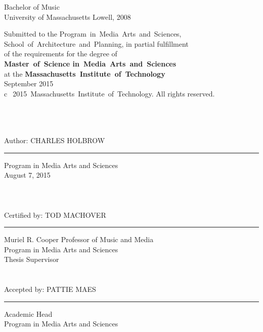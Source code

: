 
\noindent Bachelor of Music\\
\noindent University of Massachusetts Lowell, 2008\\

\vspace{30mm}

\begin{raggedright}
\noindent Submitted to the Program~in~Media~Arts~and~Sciences,\\
School~of~Architecture~and~Planning, in partial fulfillment\\
of the requirements for the degree of\\
\textbf{Master~of~Science in~Media~Arts~and~Sciences}\\
at the \textbf{Massachusetts~Institute~of~Technology} \\
\noindent September 2015\\
\noindent \textcircled{c}~2015~Massachusetts~Institute~of~Technology. All rights reserved.\\
\end{raggedright}

\begin{fullwidth}
\mbox{ }\\
\mbox{ }\\
\mbox{ }\\


\noindent Author: \hfill CHARLES HOLBROW\vspace{3pt}\hrule\vspace{6pt}
\flushright Program in Media Arts and Sciences\\
\flushright August 7, 2015\\
\mbox{ }\\
\mbox{ }\\
\mbox{ }\\
 
\noindent Certified by: \hfill TOD MACHOVER\vspace{3pt}\hrule\vspace{6pt}
Muriel R. Cooper Professor of Music and Media\\
Program in Media Arts and Sciences\\
Thesis Supervisor\\
\mbox{ }\\ 
\mbox{ }\\

\noindent Accepted by: \hfill PATTIE MAES\vspace{3pt}\hrule\vspace{6pt}
Academic Head\\
Program in Media Arts and Sciences\\

\thispagestyle{empty}  %
\end{fullwidth}
\clearpage
